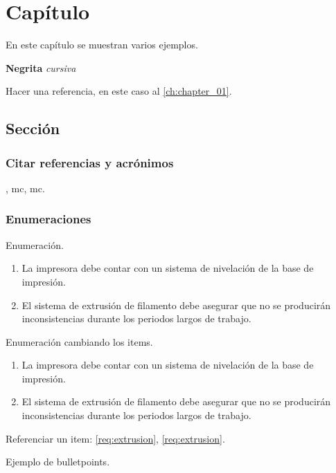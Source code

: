 \chapter{Capítulo} \label{ch:chapter_01}

En este capítulo se muestran varios ejemplos.

\textbf{Negrita} \textit{cursiva}

Hacer una referencia, en este caso al \autoref{ch:chapter_01}.



\section{Sección}

\subsection{Citar referencias y acrónimos}

\cite{im78552}, \acrshort{mc}, \acrfull{mc}.

\subsection{Enumeraciones}

Enumeración.

\begin{enumerate}
	\item La impresora debe contar con un sistema de nivelación de la base de impresión.
	\item El sistema de extrusión de filamento debe asegurar que no se producirán inconsistencias durante los periodos largos de trabajo.
\end{enumerate}

Enumeración cambiando los items.

\begin{enumerate}[label= \textbf{R-\arabic*}]
	\item La impresora debe contar con un sistema de nivelación de la base de impresión.
	\item El sistema de extrusión de filamento debe asegurar que no se producirán inconsistencias durante los periodos largos de trabajo. \label{req:extrusion}
\end{enumerate}

Referenciar un item: \ref{req:extrusion}, \autoref{req:extrusion}.


Ejemplo de bulletpoints.


